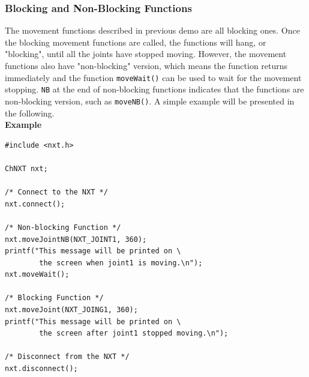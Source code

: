 \documentclass[11pt]{article}
\begin{document}
\subsubsection{\label{sec:block_nonblock}Blocking and Non-Blocking Functions}
The movement functions described in previous demo are all blocking ones. Once the blocking movement functions
are called, the functions will hang, or "blocking", until all the joints have stopped moving.
However, the movement functions also have "non-blocking" version, which means the function returns 
immediately and the function \texttt{moveWait()} can be used to wait for the movement stopping. \texttt{NB} at
the end of non-blocking functions indicates that the functions are non-blocking version, such as \texttt{moveNB()}. 
A simple example will be presented in the following.\\

\noindent
\textbf{Example}
\begin{verbatim}
#include <nxt.h>

ChNXT nxt;

/* Connect to the NXT */
nxt.connect();

/* Non-blocking Function */
nxt.moveJointNB(NXT_JOINT1, 360);
printf("This message will be printed on \
        the screen when joint1 is moving.\n");
nxt.moveWait();

/* Blocking Function */
nxt.moveJoint(NXT_JOING1, 360);
printf("This message will be printed on \
        the screen after joint1 stopped moving.\n");

/* Disconnect from the NXT */
nxt.disconnect();
\end{verbatim}
\end{document}
